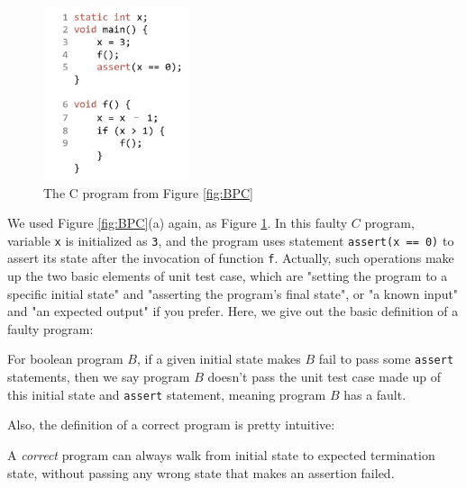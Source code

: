\begin{figure}
\centering
\includegraphics[width=1.7in,height=2in]{Fig3-1.jpg}
\caption{The C program from Figure \ref{fig:BPC}}
\label{fig:FC}
\end{figure}

We used Figure \ref{fig:BPC}(a) again, as Figure \ref{fig:FC}. In this faulty $C$ program, variable \lstinline|x| is initialized as \lstinline|3|, and the program uses statement \lstinline|assert(x == 0)| to assert its state after the invocation of function \lstinline|f|.
Actually, such operations make up the two basic elements of unit test case, which are "setting the program to a specific initial state" and "asserting the program's final state", or "a known input" and "an expected output" if you prefer.
Here, we give out the basic definition of a faulty program:

\begin{definition}
\label{definition:FaultyProgram}
For boolean program $B$, if a given initial state makes $B$ fail to pass some \lstinline|assert| statements, then we say program $B$ doesn't pass the unit test case made up of this initial state and \lstinline|assert| statement,
meaning program $B$ has a fault.
\end{definition}

Also, the definition of a correct program is pretty intuitive:

\begin{definition}
\label{definition:CorrectProgram}
A {\it correct} program can always walk from initial state to expected termination state, without passing any wrong state that makes an assertion failed.
\end{definition}


